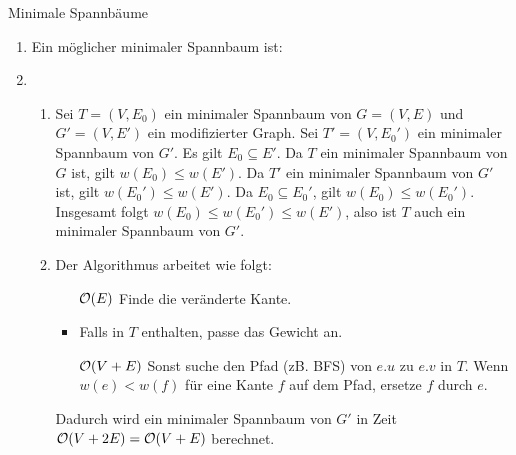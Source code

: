 \documentclass{article}
\begin{document}
\begin{exercise}{Minimale Spannbäume}{}
  \begin{solution}
    \begin{enumerate}
      \item Ein möglicher minimaler Spannbaum ist: 
      \item \begin{enumerate}
              \item Sei $T = (V, E_0)$ ein minimaler Spannbaum von $G = (V, E)$ und $G' = (V, E')$ ein modifizierter Graph. Sei $T' = (V, E_0')$ ein minimaler Spannbaum von $G'$. Es gilt $E_0 \subseteq E'$. Da $T$ ein minimaler Spannbaum von $G$ ist, gilt $w(E_0) \leq w(E')$. Da $T'$ ein minimaler Spannbaum von $G'$ ist, gilt $w(E_0') \leq w(E')$. Da $E_0 \subseteq E_0'$, gilt $w(E_0) \leq w(E_0')$. Insgesamt folgt $w(E_0) \leq w(E_0') \leq w(E')$, also ist $T$ auch ein minimaler Spannbaum von $G'$.
              \item Der Algorithmus arbeitet wie folgt: \begin{itemize}
                      \item[$\mathcal{O}(E)$] Finde die veränderte Kante.
                      \item Falls in $T$ enthalten, passe das Gewicht an.
                      \item[$\mathcal{O}(V+E)$] Sonst suche den Pfad (zB. BFS) von $e.u$ zu $e.v$ in $T$. Wenn $w(e) < w(f)$ für eine Kante $f$ auf dem Pfad, ersetze $f$ durch $e$.
                    \end{itemize}
                    Dadurch wird ein minimaler Spannbaum von $G'$ in Zeit $\mathcal{O}(V+2E)=\mathcal{O}(V+E)$ berechnet.
            \end{enumerate}
    \end{enumerate}
  \end{solution}

\end{exercise}
\end{document}
